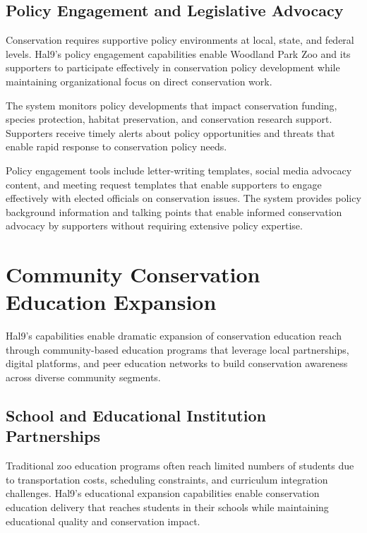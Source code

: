 \documentclass[
  Letterpaper,
]{scrbook}
\begin{document}
\subsection{Policy Engagement and Legislative
Advocacy}\label{policy-engagement-and-legislative-advocacy}

Conservation requires supportive policy environments at local, state,
and federal levels. Hal9's policy engagement capabilities enable
Woodland Park Zoo and its supporters to participate effectively in
conservation policy development while maintaining organizational focus
on direct conservation work.

The system monitors policy developments that impact conservation
funding, species protection, habitat preservation, and conservation
research support. Supporters receive timely alerts about policy
opportunities and threats that enable rapid response to conservation
policy needs.

Policy engagement tools include letter-writing templates, social media
advocacy content, and meeting request templates that enable supporters
to engage effectively with elected officials on conservation issues. The
system provides policy background information and talking points that
enable informed conservation advocacy by supporters without requiring
extensive policy expertise.

\section{Community Conservation Education
Expansion}\label{community-conservation-education-expansion}

Hal9's capabilities enable dramatic expansion of conservation education
reach through community-based education programs that leverage local
partnerships, digital platforms, and peer education networks to build
conservation awareness across diverse community segments.

\subsection{School and Educational Institution
Partnerships}\label{school-and-educational-institution-partnerships}

Traditional zoo education programs often reach limited numbers of
students due to transportation costs, scheduling constraints, and
curriculum integration challenges. Hal9's educational expansion
capabilities enable conservation education delivery that reaches
students in their schools while maintaining educational quality and
conservation impact.
\end{document}
